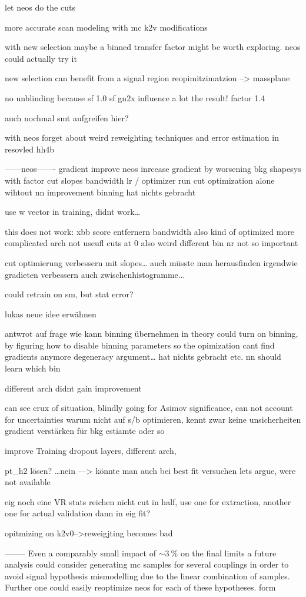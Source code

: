 let neos do the cuts 

more accurate scan modeling with mc k2v modifications 

with new selection maybe a binned transfer factor might be worth exploring.
neos could actually try it

new selection can benefit from a signal region reopimitzimatzion --> massplane


no unblinding because sf
1.0 sf gn2x influence a lot the result! factor 1.4 


auch nochmal smt aufgreifen hier?


with neos forget about weird reweighting techniques and error estimation in resovled hh4b


------neos-------
gradient improve neos
inrcease gradient by worsening bkg shapesys with factor
cut slopes
bandwidth 
lr / optimizer
run cut optimization alone wihtout nn improvement
binning hat nichts gebracht

use w vector in training, didnt work…

this does not work:
xbb score entfernern
bandwidth also kind of optimized
more complicated arch not useufl
cuts at 0 also weird 
different bin nr not so important

cut optimierung verbessern mit slopes… 
auch müsste man herausfinden 
irgendwie gradieten verbessern auch zwischenhistogramme...

could retrain on sm, but stat error?

lukas neue idee erwähnen



antwrot auf frage wie kann binning übernehmen 
in theory could turn on binning, by figuring how to disable binning parameters so the opimization cant find gradients anymore 
degeneracy argument… hat nichts gebracht etc. nn should learn which bin


different arch didnt gain improvement


can see crux of situation, blindly going for Asimov significance, can not account for uncertainties
warum nicht auf s/b optimieren, kennt zwar keine unsicherheiten
gradient verstärken für bkg estiamte oder so


improve Training
dropout layers, different arch, 


pt_h2 lösen? …nein —> könnte man auch bei best fit versuchen
lets argue, were not available

eig noch eine VR
stats reichen nicht 
cut in half, use one for extraction, another one for actual validation dann in eig fit?

opitmizing on k2v0-->reweigjting becomes bad


--------
Even a comparably small impact of $\sim\qty[]{3}{\percent}$ on the final limits a future analysis could consider generating \ac{mc} samples for several \ktwov couplings in order to avoid signal hypothesis mismodelling due to the linear combination of samples. Further one could easily reoptimize neos for each of these hypotheses. form
